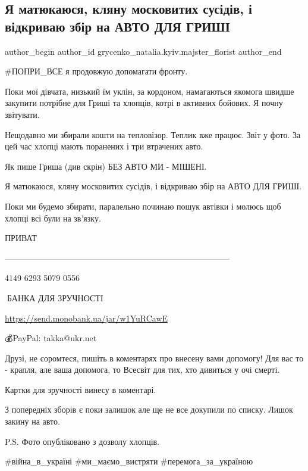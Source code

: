  
 
 
 
 

\subsection{Я матюкаюся, кляну московитих сусідів, і відкриваю збір на АВТО ДЛЯ ГРИШІ}
\label{sec:19_01_2023.fb.grycenko_natalia.kyiv.majster_florist.1.ya_matyukayusya__kly}

\ifcmt
 author_begin
   author_id grycenko_natalia.kyiv.majster_florist
 author_end
\fi

\#ПОПРИ\_ВСЕ я продовжую допомагати фронту. 

Поки мої дівчата, низький їм уклін, за кордоном, намагаються якомога швидше
закупити потрібне для Гриші та хлопців, котрі в активних бойових. Я почну
звітувати. 

Нещодавно ми збирали кошти на тепловізор. Теплик вже працює. Звіт у фото. За
цей час хлопці мають поранених і три втрачених авто. 

Як пише Гриша (див скрін) БЕЗ АВТО МИ - МІШЕНІ. 

Я матюкаюся, кляну московитих сусідів, і відкриваю збір на АВТО ДЛЯ ГРИШІ. 

Поки ми будемо збирати, паралельно починаю пошук автівки і молюсь щоб хлопці
всі були на зв'язку. 

ПРИВАТ 

———————————————————————————

4149 6293 5079 0556

🫙БАНКА ДЛЯ ЗРУЧНОСТІ 

\url{https://send.monobank.ua/jar/w1YuRCawE}

💰PayPal: takka@ukr.net 

Друзі, не соромтеся, пишіть в коментарях про внесену вами допомогу! Для вас то
- крапля, але ваша допомога, то Всесвіт для тих, хто дивиться у очі смерті. 

Картки для зручності винесу в коментарі.

З попередніх зборів є поки залишок але ще не все докупили по списку. Лишок
закину на авто. 

P.S. Фото опубліковано з дозволу хлопців.

\#війна\_в\_україні \#ми\_маємо\_вистряти \#перемога\_за\_україною
